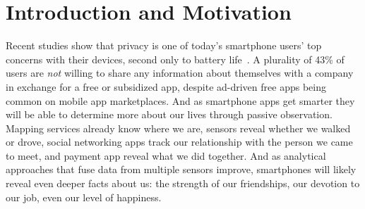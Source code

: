 
\section{Introduction and Motivation}
\label{sec-introduction}

Recent studies show that privacy is one of today's smartphone users' top
concerns with their devices, second only to battery
life~\cite{truste-privacy}. A plurality of 43\% of users are \textit{not}
willing to share any information about themselves with a company in exchange
for a free or subsidized app, despite ad-driven free apps being common on
mobile app marketplaces. And as smartphone apps get smarter they will be able
to determine more about our lives through passive observation. Mapping
services already know where we are, sensors reveal whether we walked or
drove, social networking apps track our relationship with the person we came
to meet, and payment app reveal what we did together. And as analytical
approaches that fuse data from multiple sensors improve, smartphones will
likely reveal even deeper facts about us: the strength of our friendships,
our devotion to our job, even our level of happiness.



